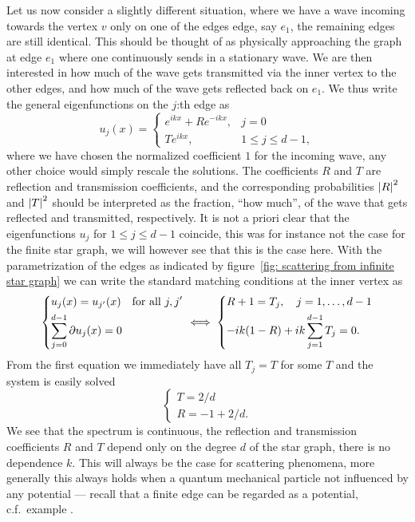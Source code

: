 Let us now consider a slightly different situation, where we have a wave incoming towards the vertex $v$ only on one of the edges edge, say $e_1$, the remaining edges are still identical. This should be thought of as physically approaching the graph at edge $e_1$ where one continuously sends in a stationary wave. We are then interested in how much of the wave gets transmitted via the inner vertex to the other edges, and how much of the wave gets reflected back on $e_1$. We thus write the general eigenfunctions on the $j$:th edge as
\[
  u_j(x) =
  \begin{cases}
    e^{ikx} + Re^{-ikx}, & j = 0 \\
    Te^{ikx}, & 1 \le j \le d-1,
  \end{cases}
\]
where we have chosen the normalized coefficient $1$ for the incoming wave, any other choice would simply rescale the solutions. The coefficients $R$ and $T$ are reflection and transmission coefficients, and the corresponding probabilities $\left\lvert R\right\rvert^2$ and $\left\lvert T\right\rvert^2$ should be interpreted as the fraction, ``how much'', of the wave that gets reflected and transmitted, respectively. It is not a priori clear that the eigenfunctions $u_j$ for $1 \le j \le d-1$ coincide, this was for instance not the case for the finite star graph, we will however see that this is the case here. With the parametrization of the edges as indicated by figure~\ref{fig: scattering from infinite star graph} we can write the standard matching conditions at the inner vertex as
\[
  \begin{dcases}
    u_j(x) = u_{j'}(x) \quad \text{for all } j, j' \\
    \sum_{j=0}^{d-1} \partial u_j(x) = 0
  \end{dcases}
  \iff
  \begin{dcases}
    R+1 = T_j, \quad j = 1, \ldots, d-1 \\
    -ik(1-R)+ik\sum_{j=1}^{d-1} T_j = 0.
  \end{dcases}
\]
From the first equation we immediately have all $T_j = T$ for some $T$ and the system is easily solved
\[
  \begin{cases}
    T = 2/d \\
    R = -1 + 2/d.
  \end{cases}
\]
We see that the spectrum is continuous, the reflection and transmission coefficients $R$ and $T$ depend only on the degree $d$ of the star graph, there is no dependence $k$. This will always be the case for scattering phenomena, more generally this always holds when a quantum mechanical particle not influenced by any potential --- recall that a finite edge can be regarded as a potential, c.f.\ example \label{ex: particle in a box}.

